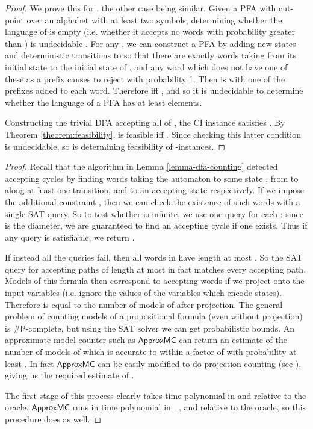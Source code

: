 \documentclass[a4paper,USenglish,numberwithinsect]{lipics}
\theoremstyle{plain}
\theoremstyle{definition}
\newcommand{\sharpP}{\ensuremath{\mathsf{\# P}}}
\newcommand{\ApproxMC}{\ensuremath{\mathsf{ApproxMC}}}
\begin{document}
\theoremPFAHardness*
\begin{proof}
We prove this for , the other case being similar. Given a PFA  with cut-point  over an alphabet  with at least two symbols, determining whether the language of  is empty (i.e. whether it accepts no words with probability greater than ) is undecidable \cite{nasu-honda,condon-lipton}. For any , we can construct a PFA  by adding new states and deterministic transitions to  so that there are exactly  words taking  from its initial state to the initial state of , and any word which does not have one of these as a prefix causes  to reject with probability 1. Then  is  with one of the  prefixes added to each word. Therefore  iff , and so it is undecidable to determine whether the language of a PFA has at least  elements.

Constructing the trivial DFA  accepting all of , the CI instance  satisfies . By Theorem \ref{theorem:feasibility},  is feasible iff . Since checking this latter condition is undecidable, so is determining feasibility of -instances.
\end{proof}

\lemmaSymbolicCount*
\begin{proof}
Recall that the algorithm in Lemma \ref{lemma-dfa-counting} detected
accepting cycles by finding words  taking the automaton to some
state , from  to  along at least one transition, and to an
accepting state respectively. If we impose the additional constraint
, then we can check the existence of such words
with a single SAT query. So to test whether  is
infinite, we use one query for each : since  is the
diameter, we are guaranteed to find an accepting cycle if one
exists. Thus if any query is satisfiable, we return . 

If instead all the queries fail, then all words in 
have length at most . So the SAT query  for accepting paths
of length at most  in fact matches every accepting path. Models of
this formula then correspond to accepting words if we project onto the
input variables (i.e. ignore the values of the variables which encode
states). Therefore  is equal to the number of models
of  after projection. The general problem of counting models of
a propositional formula (even without projection) is \sharpP-complete,
but using the SAT solver we can get probabilistic bounds. An
approximate model counter such as {\ApproxMC} \cite{approxmc} can
return an estimate of the number of models of  which is accurate
to within a factor of  with probability at least . In fact {\ApproxMC} can be easily modified to do projection
counting (see \cite{unigen}), giving us the required estimate of
. 

The first stage of this process clearly takes time polynomial in  and  relative to the oracle. {\ApproxMC} runs in time polynomial in , , and  relative to the oracle, so this procedure does as well.
\end{proof}
\end{document}
